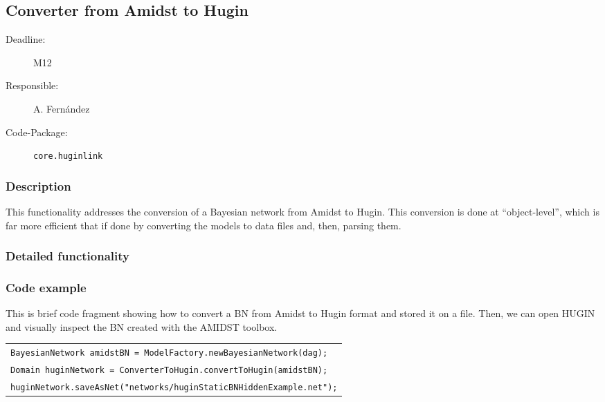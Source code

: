 \newpage
\subsection{Converter from Amidst to Hugin}
\label{ConverterFromAmidstToHugin}

\begin{description}
\item[Deadline:] M12
\item[Responsible:] A. Fern\'andez
\item[Code-Package:] \texttt{core.huginlink}
\end{description}
\subsubsection*{Description}

This functionality addresses the conversion of a Bayesian network from Amidst to Hugin. This conversion is done at ``object-level'', which is far more efficient that if done by converting the models to data files and, then, parsing them. 

\subsubsection*{Detailed functionality}

\vspace{1in}

\subsubsection*{Code example}

This is brief code fragment showing how to convert a BN from Amidst to Hugin format and stored it on a file. Then, we can open HUGIN and visually inspect the BN created with the AMIDST toolbox. 

\begin{table}[H]
\begin{tabular}{l} \hline
\texttt{BayesianNetwork amidstBN = ModelFactory.newBayesianNetwork(dag);}\\
\texttt{Domain huginNetwork = ConverterToHugin.convertToHugin(amidstBN);}\\
\texttt{huginNetwork.saveAsNet("networks/huginStaticBNHiddenExample.net");}\\ \hline

\end{tabular}
\end{table} 